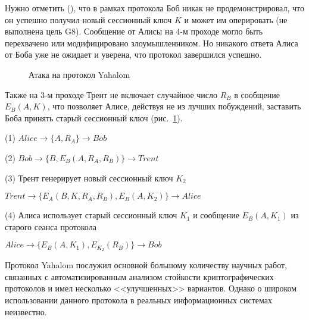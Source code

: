 Нужно отметить (\cite{Zhou:Yu:Pan:Wang:2016}), что в рамках протокола Боб никак не продемонстрировал, что он успешно получил новый сессионный ключ $K$ и может им оперировать (не выполнена цель G8). Сообщение от Алисы на 4-м проходе могло быть перехвачено или модифицировано злоумышленником. Но никакого ответа Алиса от Боба уже не ожидает и уверена, что протокол завершился успешно.

\begin{figure}[thb]
	\centering
	\begin{sequencediagram}
		
	\end{sequencediagram}
	\caption{Атака на протокол Yahalom\label{fig:key_distribution-yahalom-attack}}
\end{figure}

Также на 3-м проходе Трент не включает случайное число $R_B$ в сообщение $E_B(A, K)$, что позволяет Алисе, действуя не из лучших побуждений, заставить Боба принять старый сессионный ключ (рис.~\ref{fig:key_distribution-yahalom-attack}).

\begin{protocol}
	\item[(1)] $Alice \to \{ A, R_A \} \to Bob$
	\item[(2)] $Bob \to \{ B, E_B( A, R_A, R_B ) \} \to Trent$
	\item[(3)] Трент генерирует новый сессионный ключ $K_2$
	\item[{}] $Trent \to \{ E_A( B, K, R_A, R_B ), E_B(A, K_2) \} \to Alice$
	\item[(4)] Алиса использует старый сессионный ключ $K_1$ и сообщение $E_B( A, K_1 )$ из старого сеанса протокола
	\item[{}] $Alice \to \{ E_B( A, K_1 ), E_{K_2}( R_B ) \} \to Bob$
\end{protocol}

Протокол Yahalom послужил основной большому количеству научных работ, связанных с автоматизированным анализом стойкости криптографических протоколов и имел несколько <<улучшенных>> вариантов. Однако о широком использовании данного протокола в реальных информационных системах неизвестно.

